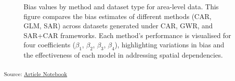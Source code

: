 \documentclass[
  default,
]{sn-jnl}
\begin{document}
\label{cell-fig-biasarealevel}
\begin{figure}[H]


\caption{\label{fig-biasarealevel}Bias values by method and dataset type
for area-level data. This figure compares the bias estimates of
different methods (CAR, GLM, SAR) across datasets generated under CAR,
GWR, and SAR+CAR frameworks. Each method's performance is visualised for
four coefficients (\(\beta_1\), \(\beta_2\), \(\beta_3\), \(\beta_4\)),
highlighting variations in bias and the effectiveness of each model in
addressing spatial dependencies.}

\end{figure}%

\textsubscript{Source:
\href{https://indiraputeri-phd.github.io/CAR_simcomp/manuscript.qmd.html}{Article
Notebook}}
\end{document}
